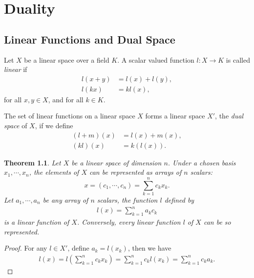 \documentclass[10pt]{book}
\newtheorem{theorem}{Theorem}[chapter]
\theoremstyle{definition}
\numberwithin{equation}{chapter}
\begin{document}
\medskip





\chapter{Duality}\label{chapter_Duality}
\section{Linear Functions and Dual Space}

Let $X$ be a linear space over a field $K$. A scalar valued function $l:X\to K$ is called \emph{linear} if 
\begin{align*}
    l(x+y) &= l(x) + l(y), \\
    l(kx) &= k l(x),
\end{align*}
for all $x,y\in X$, and for all $k\in K$.

The set of linear functions on a linear space $X$ forms a linear space $X'$, the \emph{dual space} of $X$, if we define 
\begin{align*}
    (l+m)(x) &= l(x) + m(x), \\
    (kl)(x) &= k(l(x)).
\end{align*}

\medskip

\begin{theorem}\label{theorem_dual}
Let $X$ be a linear space of dimension $n$. Under a chosen basis $x_1,\cdots,x_n$, the elements of $X$ can be represented as arrays of $n$ scalars:
$$x = (c_1,\cdots,c_n) = \sum^n_{k=1}c_k x_k.$$
Let $a_1,\cdots,a_n$ be any array of $n$ scalars, the function $l$ defined by
\begin{align*}
    l(x) = \sum^n_{k=1} a_k c_k
\end{align*}
is a linear function of $X$. Conversely, every linear function $l$ of $X$ can be so represented.
\end{theorem}
\begin{proof}
For any $l\in X'$, define $a_k = l(x_k)$, then we have 
\begin{align*}
    l(x) = l\left(\sum^n_{k=1}c_k x_k \right) = \sum^n_{k=1}c_k l(x_k) = \sum^n_{k=1}c_k a_k.
\end{align*}
\end{proof}

\medskip
\end{document}
